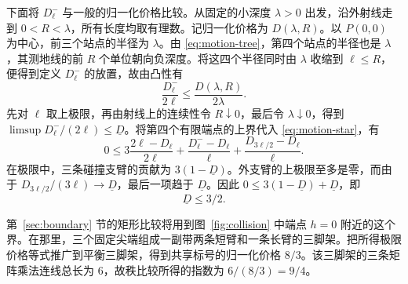下面将 \(D_\ell^-\) 与一般的归一化价格比较。从固定的小深度 \(\lambda>0\) 出发，沿外射线走到 \(0<R<\lambda\)，所有长度均取有理数。记归一化价格为 \(D(\lambda,R)\)。以 \(P(0,0)\) 为中心，前三个站点的半径为 \(\lambda\)。由 \eqref{eq:motion-tree}，第四个站点的半径也是 \(\lambda\)，其测地线的前 \(R\) 个单位朝向负深度。将这四个半径同时由 \(\lambda\) 收缩到 \(\ell\le R\)，便得到定义 \(D_\ell^-\) 的放置，故由凸性有
\[
   \frac{D_\ell^-}{2\ell}\le\frac{D(\lambda,R)}{2\lambda}.
\]
先对 \(\ell\) 取上极限，再由射线上的连续性令 \(R\downarrow0\)，最后令 \(\lambda\downarrow0\)，得到 \(\limsup D_\ell^-/(2\ell)\le \underline D\)。将第四个有限端点的上界代入 \eqref{eq:motion-star}，有
\begin{equation}\label{eq:motion-fourstar}
 0\le 3\frac{2\ell-D_\ell}{2\ell}
      +\frac{D_\ell^--D_\ell}{\ell}
      +\frac{D_{3\ell/2}-D_\ell}{\ell}.
\end{equation}
在极限中，三条碰撞支臂的贡献为 \(3(1-\underline D)\)。外支臂的上极限至多是零，而由于 \(D_{3\ell/2}/(3\ell)\to \underline D\)，最后一项趋于 \(\underline D\)。因此 \(0\le 3(1-\underline D)+\underline D\)，即
\begin{equation}\label{eq:motion-upper}
                        \underline D\le 3/2 .
\end{equation}

第~\ref{sec:boundary} 节的矩形比较将用到图~\ref{fig:collision} 中端点 \(h=0\) 附近的这个界。在那里，三个固定尖端组成一副带两条短臂和一条长臂的三脚架。把所得极限价格等式推广到平衡三脚架，得到共享标号的归一化价格 \(8/3\)。该三脚架的三条矩阵乘法连线总长为 \(6\)，故秩比较所得的指数为 \(6/(8/3)=9/4\)。
